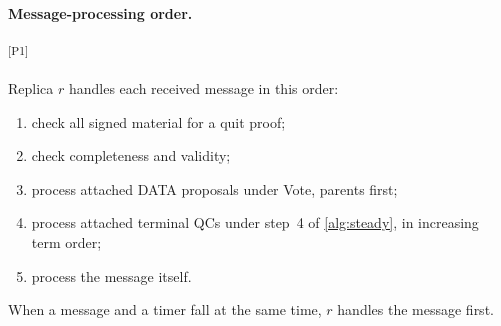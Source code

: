 \documentclass[11pt,a4paper]{article}
\newcommand{\NEW}[1]{{\color{diffNew}#1}}
\newcommand{\CH}[1]{\textsuperscript{\color{diffNew}\sffamily\scriptsize[#1]}}
\newcommand{\NEW}[1]{#1}
\newcommand{\CH}[1]{}
\begin{document}
\paragraph{\NEW{Message-processing order.}}\CH{P1}
\NEW{Replica $r$ handles each received message in this order:
\begin{enumerate}[label=(\arabic*)]
\item check all signed material for a quit proof;
\item check completeness and validity;
\item process attached DATA proposals under Vote, parents first;
\item process attached terminal QCs under step~4 of \cref{alg:steady}, in
increasing term order;
\item process the message itself.
\end{enumerate}
When a message and a timer fall at the same time, $r$ handles the message
first.}
\end{document}
